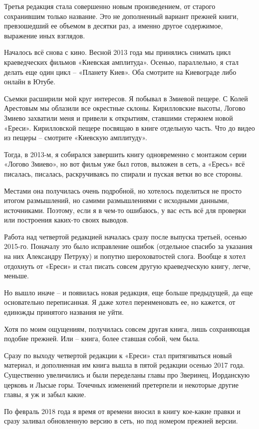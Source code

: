 Третья редакция стала совершенно новым произведением, от старого сохранившим только название. Это не дополненный вариант прежней книги, превзошедший ее объемом в десятки раз, а именно другое содержимое, выражение иных взглядов.

Началось всё снова с кино. Весной 2013 года мы принялись снимать цикл краеведческих фильмов «Киевская амплитуда». Осенью, параллельно, я стал делать еще один цикл – «Планету Киев». Оба смотрите на Киевограде либо онлайн в Ютубе.

Съемки расширили мой круг интересов. Я побывал в Змиевой пещере. С Колей Арестовым мы облазили все окрестные склоны. Кирилловские высоты, Логово Змиево захватили меня и привели к открытиям, ставшими стержнем новой «Ереси». Кирилловской пещере посвящаю в книге отдельную часть. Что до видео из пещеры – смотрите «Киевскую амплитуду».

Тогда, в 2013-м, я собирался завершить книгу одновременно с монтажом серии «Логово Змиево», но вот фильм уже был готов, выложен в сеть, а «Ересь» всё писалась, писалась, раскручиваясь по спирали и пуская ветки во все стороны.

Местами она получилась очень подробной, но хотелось поделиться не просто итогом размышлений, но самими размышлениями с исходными данными, источниками. Поэтому, если я в чем-то ошибаюсь, у вас есть всё для проверки или построения каких-то своих выводов.

Работа над четвертой редакцией началась сразу после выпуска третьей, осенью 2015-го. Поначалу это было исправление ошибок (отдельное спасибо за указания на них Александру Петруку) и попутно шероховатостей слога. Вообще я хотел отдохнуть от «Ереси» и стал писать совсем другую краеведческую книгу, легче, меньше.

Но вышло иначе – и появилась новая редакция, еще больше предыдущей, да еще основательно переписанная. Я даже хотел переименовать ее, но кажется, от единожды принятого названия не уйти. 

Хотя по моим ощущениям, получилась совсем другая книга, лишь сохраняющая подобие прежней. Или – книга, более ставшая собой, чем была.

Сразу по выходу четвертой редакции к «Ереси» стал притягиваться новый материал, и дополненная им книга вышла в пятой редакции осенью 2017 года. Существенно увеличились и были переделаны главы про Зверинец, Иорданскую церковь и Лысые горы. Точечных изменений претерпели и некоторые другие главы, я уж и забыл какие.

По февраль 2018 года я время от времени вносил в книгу кое-какие правки и сразу заливал обновленную версию в сеть, но под номером прежней версии.

